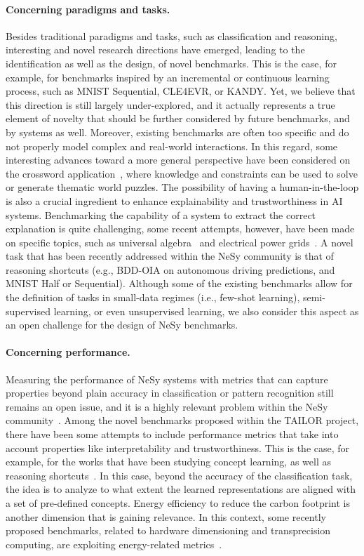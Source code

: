 \paragraph{Concerning paradigms and tasks.} 
Besides traditional paradigms and tasks, such as classification and reasoning, interesting and novel research directions have emerged, leading to the identification as well as the design, of novel benchmarks. This is the case, for example, for benchmarks inspired by an incremental or continuous learning process, such as MNIST Sequential, CLE4EVR, or KANDY. Yet, we believe that this direction is still largely under-explored, and it actually represents a true element of novelty that should be further considered by future benchmarks, and by systems as well. Moreover, existing benchmarks are often too specific and do not properly model complex and real-world interactions. In this regard, some interesting advances toward a more general perspective have been considered on the crossword application~\cite{zeinalipour2023building}, where knowledge and constraints can be used to solve or generate thematic world puzzles.
The possibility of having a human-in-the-loop is also a crucial ingredient to enhance explainability and trustworthiness in AI systems. Benchmarking the capability of a system to extract the correct explanation is quite challenging, some recent attempts, however, have been made on specific topics, such as universal algebra~\cite{giannini2024interpretable} and electrical power grids~\cite{varbella2023powergraph}.
A novel task that has been recently addressed within the NeSy community is that of reasoning shortcuts (e.g., BDD-OIA on autonomous driving predictions, and MNIST Half or Sequential). Although some of the existing benchmarks allow for the definition of tasks in small-data regimes (i.e., few-shot learning), semi-supervised learning, or even unsupervised learning, we also consider this aspect as an open challenge for the design of NeSy benchmarks.

\paragraph{Concerning performance.}
Measuring the performance of NeSy systems with metrics that can capture properties beyond plain accuracy in classification or pattern recognition still remains an open issue, and it is a highly relevant problem within the NeSy community~\cite{DBLP:conf/nesy/Lorello023}. Among the novel benchmarks proposed within the TAILOR project, there have been some attempts to include performance metrics that take into account properties like interpretability and trustworthiness. This is the case, for example, for the works that have been studying concept learning, as well as reasoning shortcuts~\cite{marconato2023neuro}. In this case, beyond the accuracy of the classification task, the idea is to analyze to what extent the learned representations are aligned with a set of pre-defined concepts. Energy efficiency to reduce the carbon footprint is another dimension that is gaining relevance. In this context, some recently proposed benchmarks, related to hardware dimensioning and transprecision computing, are exploiting energy-related metrics~\cite{francobaldi2023tinderai,spillo2023towards}. 

